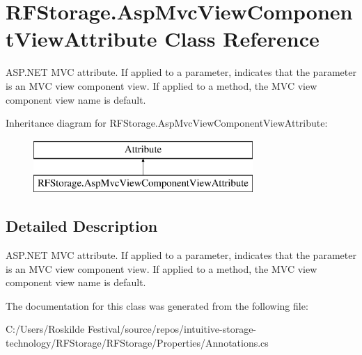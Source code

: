 \section{R\+F\+Storage.\+Asp\+Mvc\+View\+Component\+View\+Attribute Class Reference}
\label{class_r_f_storage_1_1_asp_mvc_view_component_view_attribute}


A\+S\+P.\+N\+ET M\+VC attribute. If applied to a parameter, indicates that the parameter is an M\+VC view component view. If applied to a method, the M\+VC view component view name is default.  


Inheritance diagram for R\+F\+Storage.\+Asp\+Mvc\+View\+Component\+View\+Attribute\+:\begin{figure}[H]
\begin{center}
\leavevmode
\includegraphics[height=2.000000cm]{class_r_f_storage_1_1_asp_mvc_view_component_view_attribute}
\end{center}
\end{figure}


\subsection{Detailed Description}
A\+S\+P.\+N\+ET M\+VC attribute. If applied to a parameter, indicates that the parameter is an M\+VC view component view. If applied to a method, the M\+VC view component view name is default. 



The documentation for this class was generated from the following file\+:\begin{DoxyCompactItemize}
\item 
C\+:/\+Users/\+Roskilde Festival/source/repos/intuitive-\/storage-\/technology/\+R\+F\+Storage/\+R\+F\+Storage/\+Properties/Annotations.\+cs\end{DoxyCompactItemize}
